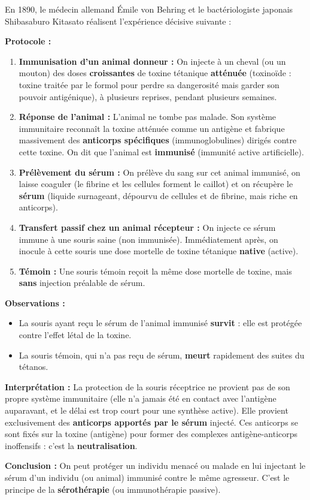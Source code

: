 \documentclass[11pt]{article}
\begin{document}
\begin{experience}
En 1890, le médecin allemand Émile von Behring et le bactériologiste japonais Shibasaburo Kitasato réalisent l'expérience décisive suivante :

\textbf{Protocole :}
\begin{enumerate}
\item \textbf{Immunisation d'un animal donneur :} On injecte à un cheval (ou un mouton) des doses \textbf{croissantes} de toxine tétanique \textbf{atténuée} (toxinoïde : toxine traitée par le formol pour perdre sa dangerosité mais garder son pouvoir antigénique), à plusieurs reprises, pendant plusieurs semaines.
\item \textbf{Réponse de l'animal :} L'animal ne tombe pas malade. Son système immunitaire reconnaît la toxine atténuée comme un antigène et fabrique massivement des \textbf{anticorps spécifiques} (immunoglobulines) dirigés contre cette toxine. On dit que l'animal est \textbf{immunisé} (immunité active artificielle).
\item \textbf{Prélèvement du sérum :} On prélève du sang sur cet animal immunisé, on laisse coaguler (le fibrine et les cellules forment le caillot) et on récupère le \textbf{sérum} (liquide surnageant, dépourvu de cellules et de fibrine, mais riche en anticorps).
\item \textbf{Transfert passif chez un animal récepteur :} On injecte ce sérum immune à une souris saine (non immunisée). Immédiatement après, on inocule à cette souris une dose mortelle de toxine tétanique \textbf{native} (active).
\item \textbf{Témoin :} Une souris témoin reçoit la même dose mortelle de toxine, mais \textbf{sans} injection préalable de sérum.
\end{enumerate}

\textbf{Observations :}
\begin{itemize}
\item La souris ayant reçu le sérum de l'animal immunisé \textbf{survit} : elle est protégée contre l'effet létal de la toxine.
\item La souris témoin, qui n'a pas reçu de sérum, \textbf{meurt} rapidement des suites du tétanos.
\end{itemize}

\textbf{Interprétation :} La protection de la souris réceptrice ne provient pas de son propre système immunitaire (elle n'a jamais été en contact avec l'antigène auparavant, et le délai est trop court pour une synthèse active). Elle provient exclusivement des \textbf{anticorps apportés par le sérum} injecté. Ces anticorps se sont fixés sur la toxine (antigène) pour former des complexes antigène-anticorps inoffensifs : c'est la \textbf{neutralisation}.

\textbf{Conclusion :} On peut protéger un individu menacé ou malade en lui injectant le sérum d'un individu (ou animal) immunisé contre le même agresseur. C'est le principe de la \textbf{sérothérapie} (ou immunothérapie passive).
\end{experience}
\end{document}
